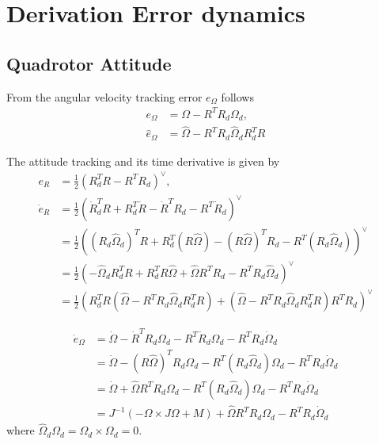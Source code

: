 
\section{Derivation Error dynamics}\label{sec:app.error}
\subsection{Quadrotor Attitude}
From the angular velocity tracking error $ e_\Omega $ follows
\begin{equation}\label{eq:app.eOmega}
\begin{aligned}
e_\Omega&=\Omega-R^TR_d\Omega_d,\\
\hat{e}_\Omega&=\hat{\Omega}-R^TR_d\hat{\Omega}_dR_d^TR
\end{aligned}
\end{equation}

The attitude tracking and its time derivative is given by
\begin{equation}\label{key}
\begin{aligned}
e_R&=\frac{1}{2}(R_d^TR-R^TR_d)^\vee,\\
\dot{e}_R&=\frac{1}{2}(\dot{R}_d^TR+R_d^T\dot{R}-\dot{R}^TR_d-R^T\dot{R}_d)^\vee\\
&=\frac{1}{2}((R_d\hat{\Omega}_d)^TR+R_d^T(R\hat{\Omega})-(R\hat{\Omega})^TR_d-R^T(R_d\hat{\Omega}_d))^\vee\\
&=\frac{1}{2}(-\hat{\Omega}_dR_d^TR+R_d^TR\hat{\Omega}+\hat{\Omega}R^TR_d-R^TR_d\hat{\Omega}_d)^\vee\\
&=\frac{1}{2}(R_d^TR(\hat{\Omega}-R^TR_d\hat{\Omega}_dR_d^TR)+(\hat{\Omega}-R^TR_d\hat{\Omega}_dR_d^TR)R^TR_d)^\vee
\end{aligned}
\end{equation}

\begin{equation}\label{key}
\begin{aligned}
\dot{e}_\Omega&=\dot{\Omega}-\dot{R}^TR_d\Omega_d-R^T\dot{R}_d\Omega_d-R^TR_d\dot{\Omega}_d\\
&=\dot{\Omega}-(R\hat{\Omega})^TR_d\Omega_d-R^T({R}_d\hat{\Omega}_d)\Omega_d-R^TR_d\dot{\Omega}_d\\
&=\dot{\Omega}+\hat{\Omega}R^TR_d\Omega_d-R^T({R}_d\hat{\Omega}_d)\Omega_d-R^TR_d\dot{\Omega}_d\\
&=J^{-1}(-\Omega\times J\Omega + M)+\hat{\Omega}R^TR_d\Omega_d-R^TR_d\dot{\Omega}_d
\end{aligned}
\end{equation}
where $\hat{\Omega}_d\Omega_d=\Omega_d \times \Omega_d=0  $.

